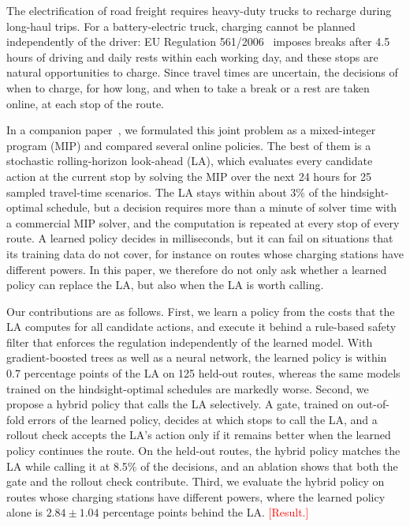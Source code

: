 \documentclass[runningheads]{llncs}
\newcommand{\tbd}[1]{\textcolor{red}{[#1]}}
\begin{document}
The electrification of road freight requires heavy-duty trucks to recharge
during long-haul trips. For a battery-electric truck, charging cannot be
planned independently of the driver: EU Regulation 561/2006~\cite{eu561}
imposes breaks after 4.5 hours of driving and daily rests within each working
day, and these stops are natural opportunities to charge. Since travel times
are uncertain, the decisions of when to charge, for how long, and when to
take a break or a rest are taken online, at each stop of the route.

In a companion paper~\cite{pagnier_bakker_journal}, we formulated this joint
problem as a mixed-integer program (MIP) and compared several online policies.
The best of them is a stochastic rolling-horizon look-ahead (LA), which
evaluates every candidate action at the current stop by solving the MIP over
the next 24 hours for 25 sampled travel-time scenarios. The LA stays within
about 3\% of the hindsight-optimal schedule, but a decision requires more than
a minute of solver time with a commercial MIP solver, and the computation is
repeated at every stop of every route. A learned policy decides in
milliseconds, but it can fail on situations that its training data do not
cover, for instance on routes whose charging stations have different powers.
In this paper, we therefore do not only ask whether a learned policy can
replace the LA, but also when the LA is worth calling.

Our contributions are as follows. First, we learn a policy from the costs that
the LA computes for all candidate actions, and execute it behind a rule-based
safety filter that enforces the regulation independently of the learned
model. With gradient-boosted trees as well as a neural network, the learned
policy is within 0.7 percentage points of the LA on 125 held-out routes,
whereas the same models trained on the hindsight-optimal schedules are
markedly worse. Second, we propose a hybrid policy that calls the LA
selectively. A gate, trained on out-of-fold errors of the learned policy,
decides at which stops to call the LA, and a rollout check accepts the LA's
action only if it remains better when the learned policy continues the route.
On the held-out routes, the hybrid policy matches the LA while calling it at
8.5\% of the decisions, and an ablation shows that both the gate and the
rollout check contribute. Third, we evaluate the hybrid policy on routes whose
charging stations have different powers, where the learned policy alone is
$2.84\pm1.04$ percentage points behind the LA. \tbd{Result.}
\end{document}
